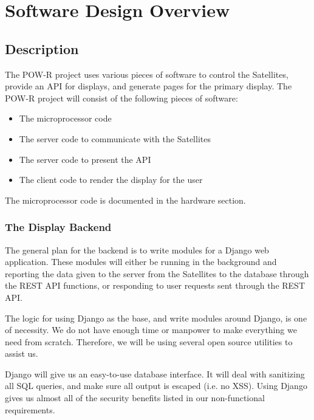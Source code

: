 
\chapter{Software Design Overview}

\section{Description}

The \ac{POW-R} project uses various pieces of software to control the Satellites, provide an \ac{API} for displays, and generate pages for the primary display.
The \ac{POW-R} project will consist of the following pieces of software:
\begin{itemize}
 \item The microprocessor code
 \item The server code to communicate with the Satellites
 \item The server code to present the \ac{API}
 \item The client code to render the display for the user
\end{itemize}

The microprocessor code is documented in the hardware section.

\subsection{The Display Backend}

The general plan for the backend is to write modules for a Django web application.
These modules will either be running in the background and reporting the data given to the server from the Satellites to the database through the \ac{REST} \ac{API} functions, or responding to user requests sent through the \ac{REST} \ac{API}.

The logic for using Django as the base, and write modules around Django, is one of necessity.
We do not have enough time or manpower to make everything we need from scratch.
Therefore, we will be using several open source utilities to assist us.


Django will give us an easy-to-use database interface.
It will deal with sanitizing all \ac{SQL} queries, and make sure all output is escaped (i.e. no \ac{XSS}).
Using Django gives us almost all of the security benefits listed in our non-functional requirements.

